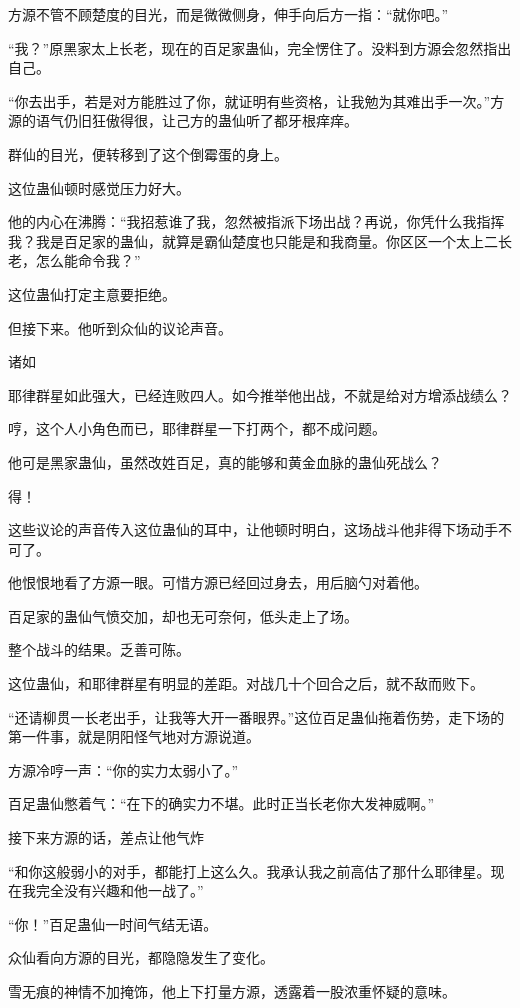 \begin{this_body}
方源不管不顾楚度的目光，而是微微侧身，伸手向后方一指：“就你吧。”

“我？”原黑家太上长老，现在的百足家蛊仙，完全愣住了。没料到方源会忽然指出自己。

“你去出手，若是对方能胜过了你，就证明有些资格，让我勉为其难出手一次。”方源的语气仍旧狂傲得很，让己方的蛊仙听了都牙根痒痒。

群仙的目光，便转移到了这个倒霉蛋的身上。

这位蛊仙顿时感觉压力好大。

他的内心在沸腾：“我招惹谁了我，忽然被指派下场出战？再说，你凭什么我指挥我？我是百足家的蛊仙，就算是霸仙楚度也只能是和我商量。你区区一个太上二长老，怎么能命令我？”

这位蛊仙打定主意要拒绝。

但接下来。他听到众仙的议论声音。

诸如

耶律群星如此强大，已经连败四人。如今推举他出战，不就是给对方增添战绩么？

哼，这个人小角色而已，耶律群星一下打两个，都不成问题。

他可是黑家蛊仙，虽然改姓百足，真的能够和黄金血脉的蛊仙死战么？

得！

这些议论的声音传入这位蛊仙的耳中，让他顿时明白，这场战斗他非得下场动手不可了。

他恨恨地看了方源一眼。可惜方源已经回过身去，用后脑勺对着他。

百足家的蛊仙气愤交加，却也无可奈何，低头走上了场。

整个战斗的结果。乏善可陈。

这位蛊仙，和耶律群星有明显的差距。对战几十个回合之后，就不敌而败下。

“还请柳贯一长老出手，让我等大开一番眼界。”这位百足蛊仙拖着伤势，走下场的第一件事，就是阴阳怪气地对方源说道。

方源冷哼一声：“你的实力太弱小了。”

百足蛊仙憋着气：“在下的确实力不堪。此时正当长老你大发神威啊。”

接下来方源的话，差点让他气炸

“和你这般弱小的对手，都能打上这么久。我承认我之前高估了那什么耶律星。现在我完全没有兴趣和他一战了。”

“你！”百足蛊仙一时间气结无语。

众仙看向方源的目光，都隐隐发生了变化。

雪无痕的神情不加掩饰，他上下打量方源，透露着一股浓重怀疑的意味。


\end{this_body}
